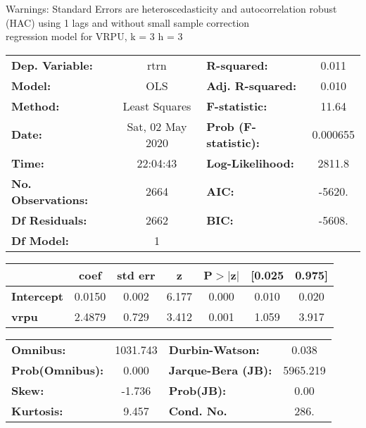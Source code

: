 Warnings: \newline
 [1] Standard Errors are heteroscedasticity and autocorrelation robust (HAC) using 1 lags and without small sample correction\\ 

regression model for VRPU, k = 3 h = 3\begin{center}
\begin{tabular}{lclc}
\toprule
\textbf{Dep. Variable:}    &       rtrn       & \textbf{  R-squared:         } &     0.011   \\
\textbf{Model:}            &       OLS        & \textbf{  Adj. R-squared:    } &     0.010   \\
\textbf{Method:}           &  Least Squares   & \textbf{  F-statistic:       } &     11.64   \\
\textbf{Date:}             & Sat, 02 May 2020 & \textbf{  Prob (F-statistic):} &  0.000655   \\
\textbf{Time:}             &     22:04:43     & \textbf{  Log-Likelihood:    } &    2811.8   \\
\textbf{No. Observations:} &        2664      & \textbf{  AIC:               } &    -5620.   \\
\textbf{Df Residuals:}     &        2662      & \textbf{  BIC:               } &    -5608.   \\
\textbf{Df Model:}         &           1      & \textbf{                     } &             \\
\bottomrule
\end{tabular}
\begin{tabular}{lcccccc}
                   & \textbf{coef} & \textbf{std err} & \textbf{z} & \textbf{P$> |$z$|$} & \textbf{[0.025} & \textbf{0.975]}  \\
\midrule
\textbf{Intercept} &       0.0150  &        0.002     &     6.177  &         0.000        &        0.010    &        0.020     \\
\textbf{vrpu}      &       2.4879  &        0.729     &     3.412  &         0.001        &        1.059    &        3.917     \\
\bottomrule
\end{tabular}
\begin{tabular}{lclc}
\textbf{Omnibus:}       & 1031.743 & \textbf{  Durbin-Watson:     } &    0.038  \\
\textbf{Prob(Omnibus):} &   0.000  & \textbf{  Jarque-Bera (JB):  } & 5965.219  \\
\textbf{Skew:}          &  -1.736  & \textbf{  Prob(JB):          } &     0.00  \\
\textbf{Kurtosis:}      &   9.457  & \textbf{  Cond. No.          } &     286.  \\
\bottomrule
\end{tabular}
\end{center}

